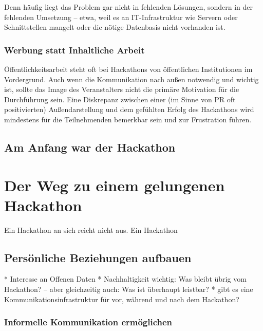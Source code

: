 Denn häufig liegt das Problem gar nicht in fehlenden Lösungen, sondern in der fehlenden Umsetzung – etwa, weil es an IT-Infrastruktur wie Servern oder Schnittstellen mangelt oder die nötige Datenbasis nicht vorhanden ist.


\subsection*{Werbung statt Inhaltliche Arbeit}

Öffentlichkeitsarbeit steht oft bei Hackathons von öffentlichen Institutionen im Vordergrund. Auch wenn die Kommunikation nach außen notwendig und wichtig ist, sollte das Image des Veranstalters nicht die primäre Motivation für die Durchführung sein. Eine Diskrepanz zwischen einer (im Sinne von PR oft positivierten) Außendarstellung und dem gefühlten Erfolg des Hackathons wird mindestens für die Teilnehmenden bemerkbar sein und zur Frustration führen.

\section{Am Anfang war der Hackathon}

\chapter{Der Weg zu einem gelungenen Hackathon}

Ein Hackathon an sich reicht nicht aus. Ein Hackathon 

\section{Persönliche Beziehungen aufbauen}

* Interesse an Offenen Daten
* Nachhaltigkeit wichtig: Was bleibt übrig vom Hackathon? – aber gleichzeitig auch: Was ist überhaupt leistbar?
* gibt es eine Kommunikationsinfrastruktur für vor, während und nach dem Hackathon?

\subsection{Informelle Kommunikation ermöglichen}

